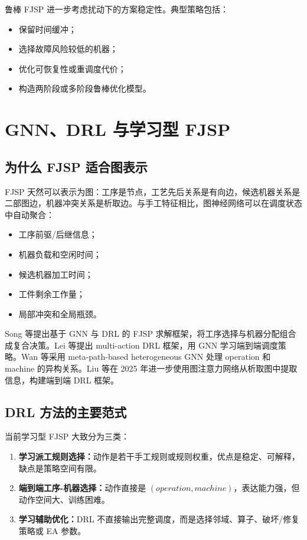 \documentclass[UTF8,a4paper,11pt]{ctexart}
\begin{document}
鲁棒 FJSP 进一步考虑扰动下的方案稳定性。典型策略包括：
\begin{itemize}
    \item 保留时间缓冲；
    \item 选择故障风险较低的机器；
    \item 优化可恢复性或重调度代价；
    \item 构造两阶段或多阶段鲁棒优化模型。
\end{itemize}

\section{GNN、DRL 与学习型 FJSP}

\subsection{为什么 FJSP 适合图表示}

FJSP 天然可以表示为图：工序是节点，工艺先后关系是有向边，候选机器关系是二部图边，机器冲突关系是析取边。与手工特征相比，图神经网络可以在调度状态中自动聚合：
\begin{itemize}
    \item 工序前驱/后继信息；
    \item 机器负载和空闲时间；
    \item 候选机器加工时间；
    \item 工件剩余工作量；
    \item 局部冲突和全局瓶颈。
\end{itemize}

Song 等提出基于 GNN 与 DRL 的 FJSP 求解框架，将工序选择与机器分配组合成复合决策\cite{Song2022GNNDRL}。Lei 等提出 multi-action DRL 框架，用 GNN 学习端到端调度策略\cite{Lei2022MultiAction}。Wan 等采用 meta-path-based heterogeneous GNN 处理 operation 和 machine 的异构关系\cite{Wan2024MHGNN}。Liu 等在 2025 年进一步使用图注意力网络从析取图中提取信息，构建端到端 DRL 框架\cite{Liu2025GNN}。

\subsection{DRL 方法的主要范式}

当前学习型 FJSP 大致分为三类：
\begin{enumerate}
    \item \textbf{学习派工规则选择：}动作是若干手工规则或规则权重，优点是稳定、可解释，缺点是策略空间有限。
    \item \textbf{端到端工序-机器选择：}动作直接是 $(operation,machine)$，表达能力强，但动作空间大、训练困难。
    \item \textbf{学习辅助优化：}DRL 不直接输出完整调度，而是选择邻域、算子、破坏/修复策略或 EA 参数。
\end{enumerate}
\end{document}
